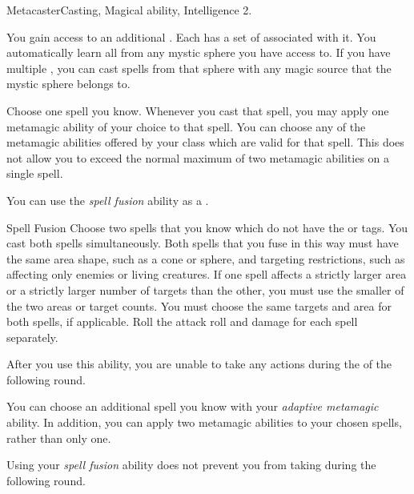     \begin{feat}{Metacaster}{Casting, Magical}
        \featpre {} ability, Intelligence 2.

         You gain access to an additional .
        Each  has a set of  associated with it.
        You automatically learn all  from any mystic sphere you have access to.
        If you have multiple , you can cast spells from that sphere with any magic source that the mystic sphere belongs to.

         Choose one spell you know.
        Whenever you cast that spell, you may apply one metamagic ability of your choice to that spell.
        You can choose any of the metamagic abilities offered by your class which are valid for that spell.
        This does not allow you to exceed the normal maximum of two metamagic abilities on a single spell.

         You can use the \textit{spell fusion} ability as a .
        \begin{activeability}{Spell Fusion}
            \rankline
            Choose two spells that you know which do not have the  or  tags.
            You cast both spells simultaneously.
            Both spells that you fuse in this way must have the same area shape, such as a cone or sphere, and targeting restrictions, such as affecting only enemies or living creatures.
            If one spell affects a strictly larger area or a strictly larger number of targets than the other, you must use the smaller of the two areas or target counts.
            You must choose the same targets and area for both spells, if applicable.
            Roll the attack roll and damage for each spell separately.

            After you use this ability, you are unable to take any actions during the  of the following round.
        \end{activeability}

         You can choose an additional spell you know with your \textit{adaptive metamagic} ability.
        In addition, you can apply two metamagic abilities to your chosen spells, rather than only one.

         Using your \textit{spell fusion} ability does not prevent you from taking  during the following round.
    \end{feat}

